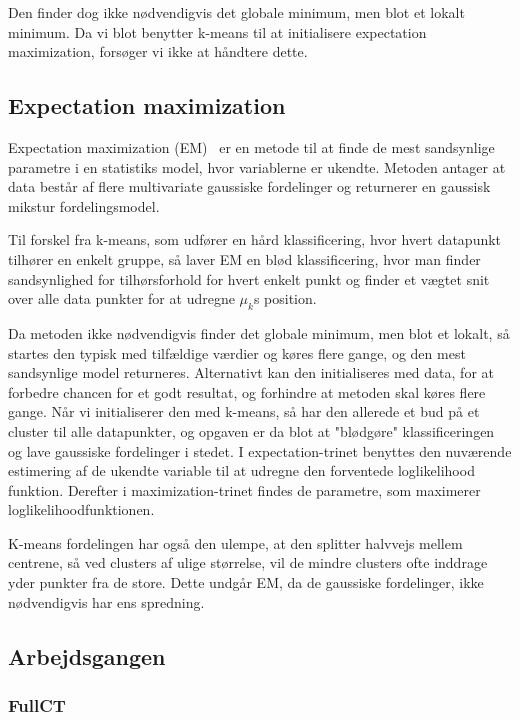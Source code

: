 Den finder dog ikke nødvendigvis det globale minimum, men blot et lokalt
minimum. Da vi blot benytter k-means til at initialisere expectation
maximization, forsøger vi ikke at håndtere dette.

\subsection{Expectation maximization}


Expectation maximization (EM)~\cite{bishop} er en metode til at finde de mest
sandsynlige parametre i en statistiks model, hvor variablerne er
ukendte. Metoden antager at data består af flere multivariate gaussiske
fordelinger og returnerer en gaussisk mikstur fordelingsmodel.

Til forskel fra k-means, som udfører en hård klassificering, hvor
hvert datapunkt tilhører en enkelt gruppe, så laver EM en blød
klassificering, hvor man finder sandsynlighed for tilhørsforhold for
hvert enkelt punkt og finder et vægtet snit over alle data punkter for at
udregne $\mu_k$s position.

Da metoden ikke nødvendigvis finder det globale minimum, men blot et
lokalt, så startes den typisk med tilfældige værdier og køres flere
gange, og den mest sandsynlige model returneres. Alternativt kan den
initialiseres med data, for at forbedre chancen for et godt resultat,
og forhindre at metoden skal køres flere gange. Når vi initialiserer
den med k-means, så har den allerede et bud på et cluster til alle
datapunkter, og opgaven er da blot at "blødgøre" klassificeringen
og lave gaussiske fordelinger i stedet. I expectation-trinet benyttes
den nuværende estimering af de ukendte variable til at udregne den
forventede loglikelihood funktion. Derefter i maximization-trinet findes
de parametre, som maximerer loglikelihoodfunktionen.

K-means fordelingen har også den ulempe, at den splitter halvvejs mellem
centrene, så ved clusters af ulige størrelse, vil de mindre clusters ofte
inddrage yder punkter fra de store. Dette undgår EM, da de gaussiske
fordelinger, ikke nødvendigvis har ens spredning.


\subsection{Arbejdsgangen}


\subsubsection{FullCT}

